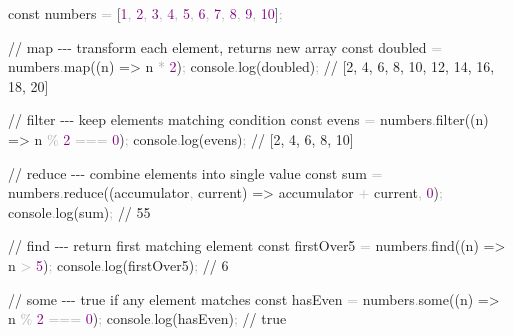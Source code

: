 \documentclass[
  justified,
  openright,
]{tufte-book}
\newcommand{\BuiltInTok}[1]{#1}
\newcommand{\CommentTok}[1]{\textcolor{MidGray}{#1}}
\newcommand{\DecValTok}[1]{\textcolor{Purple}{#1}}
\newcommand{\FunctionTok}[1]{\textcolor{BrandBlue}{#1}}
\newcommand{\KeywordTok}[1]{\textcolor{BrandBlue}{#1}}
\newcommand{\NormalTok}[1]{#1}
\newcommand{\OperatorTok}[1]{\textcolor{DarkGray}{#1}}
\newenvironment{Shaded}{%
  \begin{snugshade}
}{%
  \end{snugshade}
}
\begin{document}
\begin{Shaded}
\begin{Highlighting}[]
\KeywordTok{const}\NormalTok{ numbers }\OperatorTok{=}\NormalTok{ [}\DecValTok{1}\OperatorTok{,} \DecValTok{2}\OperatorTok{,} \DecValTok{3}\OperatorTok{,} \DecValTok{4}\OperatorTok{,} \DecValTok{5}\OperatorTok{,} \DecValTok{6}\OperatorTok{,} \DecValTok{7}\OperatorTok{,} \DecValTok{8}\OperatorTok{,} \DecValTok{9}\OperatorTok{,} \DecValTok{10}\NormalTok{]}\OperatorTok{;}

\CommentTok{// map {-}{-}{-} transform each element, returns new array}
\KeywordTok{const}\NormalTok{ doubled }\OperatorTok{=}\NormalTok{ numbers}\OperatorTok{.}\FunctionTok{map}\NormalTok{((n) }\KeywordTok{=\textgreater{}}\NormalTok{ n }\OperatorTok{*} \DecValTok{2}\NormalTok{)}\OperatorTok{;}
\BuiltInTok{console}\OperatorTok{.}\FunctionTok{log}\NormalTok{(doubled)}\OperatorTok{;} \CommentTok{// [2, 4, 6, 8, 10, 12, 14, 16, 18, 20]}

\CommentTok{// filter {-}{-}{-} keep elements matching condition}
\KeywordTok{const}\NormalTok{ evens }\OperatorTok{=}\NormalTok{ numbers}\OperatorTok{.}\FunctionTok{filter}\NormalTok{((n) }\KeywordTok{=\textgreater{}}\NormalTok{ n }\OperatorTok{\%} \DecValTok{2} \OperatorTok{===} \DecValTok{0}\NormalTok{)}\OperatorTok{;}
\BuiltInTok{console}\OperatorTok{.}\FunctionTok{log}\NormalTok{(evens)}\OperatorTok{;} \CommentTok{// [2, 4, 6, 8, 10]}

\CommentTok{// reduce {-}{-}{-} combine elements into single value}
\KeywordTok{const}\NormalTok{ sum }\OperatorTok{=}\NormalTok{ numbers}\OperatorTok{.}\FunctionTok{reduce}\NormalTok{((accumulator}\OperatorTok{,}\NormalTok{ current) }\KeywordTok{=\textgreater{}}\NormalTok{ accumulator }\OperatorTok{+}\NormalTok{ current}\OperatorTok{,} \DecValTok{0}\NormalTok{)}\OperatorTok{;}
\BuiltInTok{console}\OperatorTok{.}\FunctionTok{log}\NormalTok{(sum)}\OperatorTok{;} \CommentTok{// 55}

\CommentTok{// find {-}{-}{-} return first matching element}
\KeywordTok{const}\NormalTok{ firstOver5 }\OperatorTok{=}\NormalTok{ numbers}\OperatorTok{.}\FunctionTok{find}\NormalTok{((n) }\KeywordTok{=\textgreater{}}\NormalTok{ n }\OperatorTok{\textgreater{}} \DecValTok{5}\NormalTok{)}\OperatorTok{;}
\BuiltInTok{console}\OperatorTok{.}\FunctionTok{log}\NormalTok{(firstOver5)}\OperatorTok{;} \CommentTok{// 6}

\CommentTok{// some {-}{-}{-} true if any element matches}
\KeywordTok{const}\NormalTok{ hasEven }\OperatorTok{=}\NormalTok{ numbers}\OperatorTok{.}\FunctionTok{some}\NormalTok{((n) }\KeywordTok{=\textgreater{}}\NormalTok{ n }\OperatorTok{\%} \DecValTok{2} \OperatorTok{===} \DecValTok{0}\NormalTok{)}\OperatorTok{;}
\BuiltInTok{console}\OperatorTok{.}\FunctionTok{log}\NormalTok{(hasEven)}\OperatorTok{;} \CommentTok{// true}


\end{Highlighting}
\end{Shaded}
\end{document}
